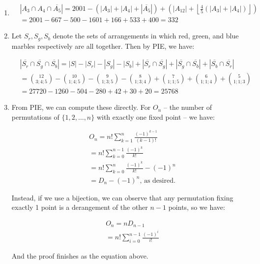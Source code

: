 \documentclass{book}
\numberwithin{equation}{section}
\begin{document}
\begin{enumerate}[label={6.\arabic*}]

\item
\begin{align*}
& |A_3 \cap A_4 \cap \overline{A_5}| = 2001 - (|A_3| + |A_4| + |\overline{A_5}|) + (|A_{12}| + \left\lfloor\frac{4}{5}(|A_3| + |A_4|)\right\rfloor) \\
& = 2001 - 667 - 500 - 1601 + 166 + 533 + 400 = 332
\end{align*}

\item
Let $S_r, S_g, S_b$ denote the sets of arrangements in which red, green, and blue marbles respectively
are all together. Then by PIE, we have:

\begin{align*}
& |\overline{S_r} \cap \overline{S_g} \cap \overline{S_b}| = |S| - |S_r| - |S_g| - |S_b| + |\overline{S_r} \cap \overline{S_g}| + |\overline{S_g} \cap \overline{S_b}| + |\overline{S_b} \cap \overline{S_r}| \\
& = {12 \choose 3;4;5} - {10 \choose 1;4;5} - {9 \choose 1;3;5} - {8 \choose 1;3;4} + {7 \choose 1;1;5} + {6 \choose 1;1;4} + {5 \choose 1;1;3} \\
& = 27720 - 1260 - 504 - 280 + 42 + 30 + 20 = 25768
\end{align*}

\item
From PIE, we can compute these directly. For $O_n$ -- the number of permutations of
$\{1, 2, \ldots, n\}$ with exactly one fixed point -- we have:

\begin{align*}
& O_n = n!\sum_{k=1}^n \frac{(-1)^{k-1}}{(k-1)!} \\
& = n!\sum_{k=0}^{n-1}\frac{(-1)^k}{k!} \\
& = n!\sum_{k=0}^{n}\frac{(-1)^k}{k!} - (-1)^n\\
& = D_n - (-1)^n \text{, as desired.}
\end{align*}

Instead, if we use a bijection, we can observe that any permutation fixing exactly 1 point is a
derangement of the other $n-1$ points, so we have:

\begin{align*}
& O_n = nD_{n-1} \\
& = n!\sum_{i=0}^{n-1}\frac{(-1)^i}{i!}
\end{align*}

And the proof finishes as the equation above.


\end{enumerate}
\end{document}
